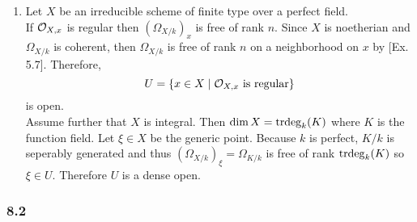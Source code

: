 \documentclass[12pt]{article}
\begin{document}
\begin{enumerate}
\item Let $X$ be an irreducible scheme of finite type over a perfect field.
\bigskip\\
If $\mathcal{O}_{X, x}$ is regular then $(\Omega_{X/k})_x$ is free of rank $n$. Since $X$ is noetherian and $\Omega_{X/k}$ is coherent, then $\Omega_{X/k}$ is free of rank $n$ on a neighborhood on $x$ by [Ex. 5.7]. Therefore,
\[ U = \{x \in X \mid \mathcal{O}_{X, x} \text{ is regular} \} \]
is open. 
\bigskip\\
Assume further that $X$ is integral. Then $\dim{X} = \mathrm{trdeg}_{k}(K)$ where $K$ is the function field. Let $\xi \in X$ be the generic point. Because $k$ is perfect, $K / k$ is seperably generated and thus $(\Omega_{X/k})_\xi = \Omega_{K/k}$ is free of rank $\mathrm{trdeg}_{k}(K)$ so $\xi \in U$. Therefore $U$ is a dense open.
\end{enumerate}

\subsubsection{8.2}
\end{document}
